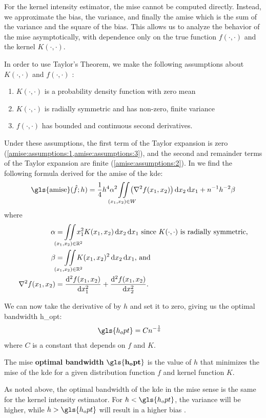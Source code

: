 For the \gls{kernel intensity estimator},
the \gls{mise} cannot be computed directly.
Instead,
we approximate the bias,
the variance,
and finally the \gls{amise} which is the sum of the variance and the square of the bias.
This allows us to analyze the behavior of the \gls{mise} asymptotically,
with dependence only on the true function $f(\cdot, \cdot)$ and the kernel $K(\cdot, \cdot)$.

In order to use Taylor's Theorem,
we make the following assumptions about $K(\cdot, \cdot)$ and $f(\cdot, \cdot)$ \citep{silverman1986density,wand1994kernel}:
\begin{enumerate}
    \item $K(\cdot, \cdot)$ is a probability density function with zero mean \label{amise:assumptions:1}
    \item $K(\cdot, \cdot)$ is radially symmetric and has non-zero, finite variance \label{amise:assumptions:2}
    \item $f(\cdot, \cdot)$ has bounded and continuous second derivatives. \label{amise:assumptions:3}
\end{enumerate}

Under these assumptions,
the first term of the Taylor expansion is zero (\cref{amise:assumptions:1,amise:assumptions:3}),
and the second and remainder terms of the Taylor expansion are finite (\cref{amise:assumptions:2}).
In \citet{silverman1986density} we find the following formula derived for the \gls{amise}
of the \gls{kde}:
\begin{equation}
    \label{eq:amise}
    \mbox{\gls{amise}}(\hat{f}; h) = 
        \frac{1}{4} h^{4} \alpha^2 \iintW{\left( \nabla^2 f \xvec \right) } +
        n^{-1} h^{-2} \beta
\end{equation}
where
\begin{align}
    \alpha & = \iintR{x_1^2 K(x_1,x_2)} ~\text{since}~K(\cdot,\cdot)~\text{is radially symmetric,}\\
    \beta & = \iintR{K(x_1,x_2)^2} \text{, and} \\
    \nabla^2 f \xvec & = \frac{\diffsq{f}\xvec}{\diff{x_1^2}} + \frac{\diffsq{f}\xvec}{\diff{x_2^2}} \text{.}
\end{align}

We can now take the derivative of  by $h$ and set it to zero,
giving us the optimal bandwidth \gls{h_opt}:
\begin{align}
    \gls{h_opt} & = C n^{-\frac{1}{6}}
\end{align}
where $C$ is a constant that depends on $f$ and $K$.
\begin{defn}
    The \gls{mise} \textbf{optimal bandwidth} $\mathbf{\gls{h_opt}}$ is the value of $h$ that minimizes the \gls{mise} of the \gls{kde} for a given distribution function $f$ and kernel function $K$.
\end{defn}
As noted above,
the optimal bandwidth of the \gls{kde} in the \gls{mise} sense is the same for the \gls{kernel intensity estimator}.
For $h < \gls{h_opt}$, the variance will be higher, while $h > \gls{h_opt}$ will result in a higher bias .

